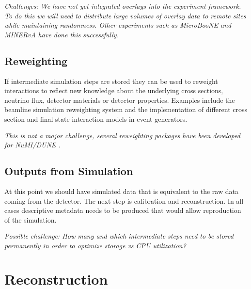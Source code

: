 \documentclass[../main-v1.tex]{subfiles}
\begin{document}
{\it Challenges: We have not yet integrated overlays into the experiment framework. To do this we will need to distribute large volumes of overlay data to remote sites while maintaining randomness. Other experiments such as MicroBooNE and MINERvA have done this successfully. }

\subsection{Reweighting}
If intermediate simulation steps  are stored they can be used to reweight interactions to reflect new knowledge about the underlying cross sections, neutrino flux, detector materials or detector properties. Examples include the  beamline simulation reweighting system and the implementation of different cross section and final-state interaction models in event generators. 

{\it This is not a major challenge, several reweighting packages have been developed for NuMI/DUNE \cite{Aliaga:2015wva, Calcutt:2021zck}.}

\subsection{Outputs from Simulation}
At this point we should have simulated data that is equivalent to the raw data coming from the detector. The next step is calibration and reconstruction. In all cases descriptive metadata needs to be produced that would allow reproduction of the simulation. 

{\it Possible challenge:  How many and which intermediate steps need to be stored permanently in order to optimize storage vs CPU utilization?}



\section{Reconstruction}






\end{document}
